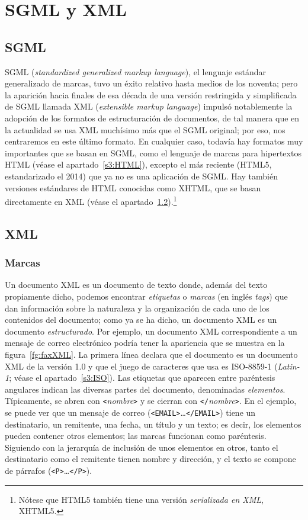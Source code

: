 \section{SGML y XML} \label{s3:SGML} \label{ss:SGML} 

\subsection{SGML} SGML (\emph{standardized generalized markup language}), el lenguaje estándar generalizado de marcas, tuvo un éxito relativo hasta medios de los noventa; pero la aparición hacia finales de esa década de una versión restringida y simplificada de SGML llamada XML (\emph{extensible markup language}) impulsó notablemente la adopción de los formatos de estructuración de documentos, de tal manera que en la actualidad se usa XML muchísimo más que el SGML original; por eso, nos centraremos en este último formato. En cualquier caso, todavía hay formatos muy importantes que se basan en SGML, como el lenguaje de marcas para hipertextos HTML (véase el apartado~\ref{s3:HTML}), excepto el más reciente (HTML5, estandarizado el 2014) que ya no es una aplicación de SGML. Hay también versiones estándares de HTML conocidas como XHTML, que se basan directamente en XML (véase el apartado~\ref{s3:XML}).\footnote{Nótese que HTML5 también tiene una versión \emph{serializada en XML}, XHTML5.} 

\subsection{XML} \label{s3:XML} 

\subsubsection{Marcas} Un documento XML es un documento de texto donde, además del texto propiamente dicho, podemos encontrar \emph{etiquetas} o \emph{marcas} (en inglés \emph{tags}) que dan información sobre la naturaleza y la organización de cada uno de los contenidos del documento; como ya se ha dicho, un documento XML es un documento \emph{estructurado}. Por ejemplo, un documento XML correspondiente a un mensaje de correo electrónico podría tener la apariencia que se muestra en la figura~\ref{fg:faxXML}. La primera línea declara que el documento es un documento XML de la versión 1.0 y que el juego de caracteres que usa es ISO-8859-1 (\emph{Latin-1}; véase el apartado~\ref{s3:ISO}). Las etiquetas que aparecen entre paréntesis angulares indican las diversas partes del documento, denominadas \emph{elementos}. Típicamente, se abren con \texttt{<}\emph{nombre}\texttt{>} y se cierran con \texttt{</}\emph{nombre}\texttt{>}. En el ejemplo, se puede ver que un mensaje de correo (\texttt{<EMAIL>}\ldots\texttt{</EMAIL>}) tiene un destinatario, un remitente, una fecha, un título y un texto; es decir, los elementos pueden contener otros elementos; las marcas funcionan como paréntesis. Siguiendo con la jerarquía de inclusión de unos elementos en otros, tanto el destinatario como el remitente tienen nombre y dirección, y el texto se compone de párrafos (\texttt{<P>}\ldots\texttt{</P>}). 

